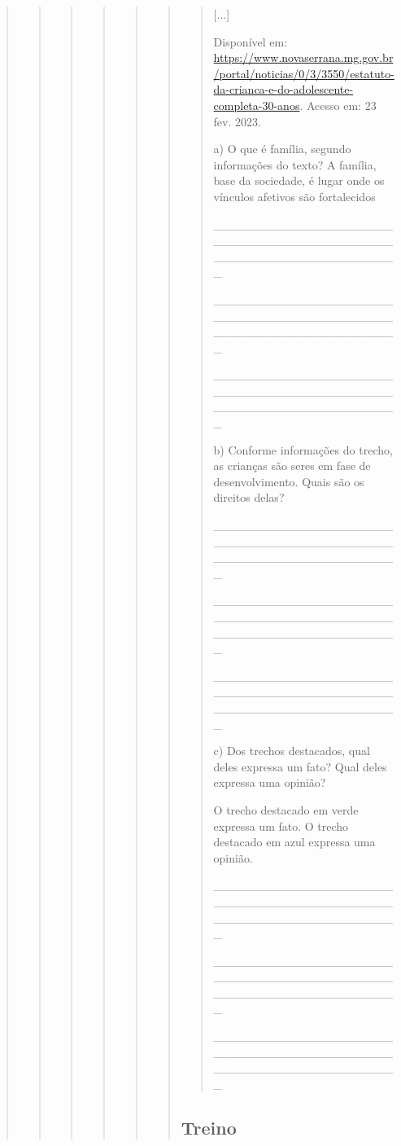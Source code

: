 \begin{quote}
\begin{quote}
\begin{quote}
\begin{quote}
\begin{quote}
\begin{quote}
\begin{quote}
{[}...{]}

Disponível em:
\url{https://www.novaserrana.mg.gov.br/portal/noticias/0/3/3550/estatuto-da-crianca-e-do-adolescente-completa-30-anos}.
Acesso em: 23 fev. 2023.

a) O que é família, segundo informações do texto? A família, base da
sociedade, é lugar onde os vínculos afetivos são fortalecidos

\_\_\_\_\_\_\_\_\_\_\_\_\_\_\_\_\_\_\_\_\_\_\_\_\_\_\_\_\_\_\_\_\_\_\_\_\_\_\_\_\_\_\_\_\_\_\_\_\_\_\_\_\_\_\_\_\_\_\_\_\_\_\_\_

\_\_\_\_\_\_\_\_\_\_\_\_\_\_\_\_\_\_\_\_\_\_\_\_\_\_\_\_\_\_\_\_\_\_\_\_\_\_\_\_\_\_\_\_\_\_\_\_\_\_\_\_\_\_\_\_\_\_\_\_\_\_\_\_

\_\_\_\_\_\_\_\_\_\_\_\_\_\_\_\_\_\_\_\_\_\_\_\_\_\_\_\_\_\_\_\_\_\_\_\_\_\_\_\_\_\_\_\_\_\_\_\_\_\_\_\_\_\_\_\_\_\_\_\_\_\_\_\_

b) Conforme informações do trecho, as crianças são seres em fase de
desenvolvimento. Quais são os direitos delas?

\_\_\_\_\_\_\_\_\_\_\_\_\_\_\_\_\_\_\_\_\_\_\_\_\_\_\_\_\_\_\_\_\_\_\_\_\_\_\_\_\_\_\_\_\_\_\_\_\_\_\_\_\_\_\_\_\_\_\_\_\_\_\_\_

\_\_\_\_\_\_\_\_\_\_\_\_\_\_\_\_\_\_\_\_\_\_\_\_\_\_\_\_\_\_\_\_\_\_\_\_\_\_\_\_\_\_\_\_\_\_\_\_\_\_\_\_\_\_\_\_\_\_\_\_\_\_\_\_

\_\_\_\_\_\_\_\_\_\_\_\_\_\_\_\_\_\_\_\_\_\_\_\_\_\_\_\_\_\_\_\_\_\_\_\_\_\_\_\_\_\_\_\_\_\_\_\_\_\_\_\_\_\_\_\_\_\_\_\_\_\_\_\_

c) Dos trechos destacados, qual deles expressa um fato? Qual deles
expressa uma opinião?

O trecho destacado em verde expressa um fato. O trecho destacado em azul
expressa uma opinião.

\_\_\_\_\_\_\_\_\_\_\_\_\_\_\_\_\_\_\_\_\_\_\_\_\_\_\_\_\_\_\_\_\_\_\_\_\_\_\_\_\_\_\_\_\_\_\_\_\_\_\_\_\_\_\_\_\_\_\_\_\_\_\_\_

\_\_\_\_\_\_\_\_\_\_\_\_\_\_\_\_\_\_\_\_\_\_\_\_\_\_\_\_\_\_\_\_\_\_\_\_\_\_\_\_\_\_\_\_\_\_\_\_\_\_\_\_\_\_\_\_\_\_\_\_\_\_\_\_

\_\_\_\_\_\_\_\_\_\_\_\_\_\_\_\_\_\_\_\_\_\_\_\_\_\_\_\_\_\_\_\_\_\_\_\_\_\_\_\_\_\_\_\_\_\_\_\_\_\_\_\_\_\_\_\_\_\_\_\_\_\_\_\_
\end{quote}

\subsection{Treino}\label{treino-7}


\end{quote}
\end{quote}
\end{quote}
\end{quote}
\end{quote}
\end{quote}
